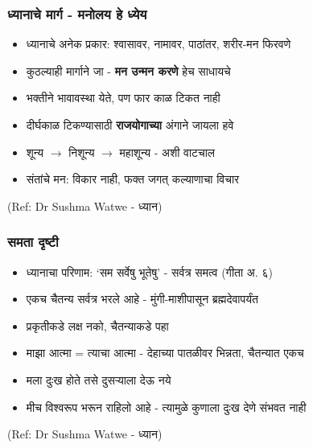 \begin{frame}[fragile]\frametitle{ध्यानाचे मार्ग - मनोलय हे ध्येय}

	\begin{itemize}
	\item ध्यानाचे अनेक प्रकार: श्वासावर, नामावर, पाठांतर, शरीर-मन फिरवणे
	\item कुठल्याही मार्गाने जा - \textbf{मन उन्मन करणे} हेच साधायचे
	\item भक्तीने भावावस्था येते, पण फार काळ टिकत नाही
	\item दीर्घकाळ टिकण्यासाठी \textbf{राजयोगाच्या} अंगाने जायला हवे
	\item शून्य $\rightarrow$ निशून्य $\rightarrow$ महाशून्य - अशी वाटचाल
	\item संतांचे मन: विकार नाही, फक्त जगत् कल्याणाचा विचार
	\end{itemize}

{\tiny (Ref: Dr Sushma Watwe - ध्यान)}

\end{frame}

\begin{frame}[fragile]\frametitle{समता दृष्टी}

	\begin{itemize}
	\item ध्यानाचा परिणाम: `सम सर्वेषु भूतेषु' - सर्वत्र समत्व (गीता अ. ६)
	\item एकच चैतन्य सर्वत्र भरले आहे - मुंगी-माशीपासून ब्रह्मदेवापर्यंत
	\item प्रकृतीकडे लक्ष नको, चैतन्याकडे पहा
	\item माझा आत्मा = त्याचा आत्मा - देहाच्या पातळीवर भिन्नता, चैतन्यात एकच
	\item मला दुःख होते तसे दुसऱ्याला देऊ नये
	\item मीच विश्वरूप भरून राहिलो आहे - त्यामुळे कुणाला दुःख देणे संभवत नाही
	\end{itemize}

{\tiny (Ref: Dr Sushma Watwe - ध्यान)}

\end{frame}

